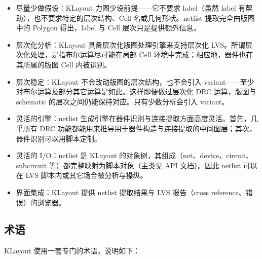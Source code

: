 \begin{itemize}
\item 尽量少做假设：KLayout 力图少设前提——它不要求 label（虽然 label 有帮助），也不要求特定的层次结构、Cell 名或几何形状。netlist 提取完全由版图中的 Polygon 得出，label 与 Cell 层次只是提供额外信息。
\item 层次化分析：KLayout 具备层次化版图处理引擎来支持层次化 LVS。所谓层次化处理，是指布尔运算尽可能在局部 Cell 环境中完成；相应地，器件也在其所属的版图 Cell 内被识别。
\item 层次稳定：KLayout 不会改动版图的层次结构，也不会引入 variant——至少对布尔运算及部分其它运算是如此。这样即便做过层次化 DRC 运算，版图与 schematic 的层次之间仍能保持对应。只有少数分析会引入 variant。
\item 灵活的引擎：netlist 生成引擎在器件识别与连接提取方面高度灵活。首先，几乎所有 DRC 功能都能用来推导用于器件构造与连接提取的中间图层；其次，器件识别可以用脚本定制。
\item 灵活的 I/O：netlist 是 KLayout 的对象树，其组成（net、device、circuit、subcircuit 等）都完整映射为脚本对象（主类见 API 文档）。因此 netlist 可以在 LVS 脚本内或其它场合被分析与操纵。
\item 界面集成：KLayout 提供 netlist 提取结果与 LVS 报告（cross reference、错误）的浏览器。
\end{itemize}

\subsection{术语}

KLayout 使用一套专门的术语，说明如下：

